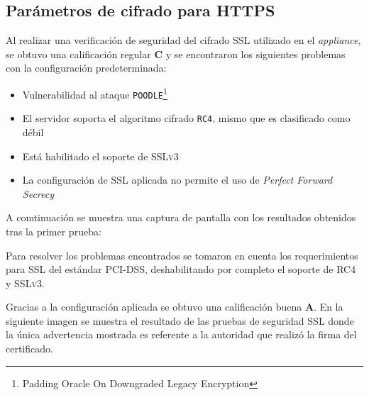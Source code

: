       \subsection {Par\'{a}metros de cifrado para \textsc{HTTPS}}

Al realizar una verificaci\'{o}n de seguridad del cifrado \textsc{\gls{SSL}} utilizado en el \textsl{appliance}, se obtuvo una calificaci\'{o}n regular \textbf{C} y se encontraron los siguientes problemas con la configuraci\'{o}n predeterminada:

\begin{itemize}
  \item Vulnerabilidad al ataque \texttt{POODLE}\footnote{Padding Oracle On Downgraded Legacy Encryption} \cite{_ssl_????-1} \cite{_ssl-poodle.pdf_????} \cite{_this_????} \cite{barnes_poodle_????} \cite{_security_????-1}

  \item El servidor soporta el algoritmo cifrado \texttt{RC4}, mismo que es clasificado como d\'{e}bil \cite{_security_????}

  \item Est\'{a} habilitado el soporte de \textsc{SSLv3}

  \item La configuraci\'{o}n de \textsc{\gls{SSL}} aplicada no permite el uso de \textsl{Perfect Forward Secrecy} \cite{_forward_2016}
\end{itemize}

A comtinuaci\'{o}n se muestra una captura de pantalla con los resultados obtenidos tras la primer prueba:


Para resolver los problemas encontrados se tomaron en cuenta los requerimientos para \textsc{\gls{SSL}} del est\'{a}ndar \textsc{\gls{PCI-DSS}}, deshabilitando por completo el soporte de \textsc{RC4} y \textsc{SSLv3}.

Gracias a la configuraci\'{o}n aplicada se obtuvo una calificaci\'{o}n buena \textbf{A}. En la siguiente imagen se muestra el resultado de las pruebas de seguridad SSL donde la \'{u}nica advertencia mostrada es referente a la autoridad que realiz\'{o} la firma del certificado. \cite{_ssl_????}


